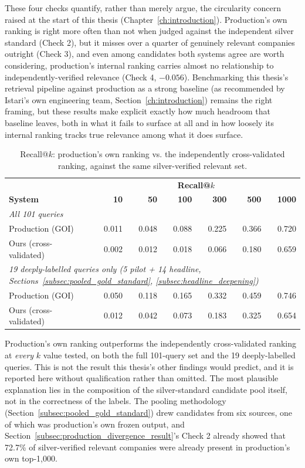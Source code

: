 \documentclass[a4paper,oneside,bibliography=totoc]{scrbook}
\begin{document}
These four checks quantify, rather than merely argue, the circularity concern raised at the start of this thesis (Chapter~\ref{ch:introduction}). Production's own ranking is right more often than not when judged against the independent silver standard (Check 2), but it misses over a quarter of genuinely relevant companies outright (Check 3), and even among candidates both systems agree are worth considering, production's internal ranking carries almost no relationship to independently-verified relevance (Check 4, $-0.056$). Benchmarking this thesis's retrieval pipeline against production as a strong baseline (as recommended by Istari's own engineering team, Section~\ref{ch:introduction}) remains the right framing, but these results make explicit exactly how much headroom that baseline leaves, both in what it fails to surface at all and in how loosely its internal ranking tracks true relevance among what it does surface.

\label{subsec:goi_vs_ours_ranking_result}

\begin{table}[ht]
\centering
\caption{Recall@$k$: production's own ranking vs. the independently cross-validated ranking, against the same silver-verified relevant set.}
\label{tab:goi_vs_ours}
\begin{tabular}{lrrrrrr}
\toprule
& \multicolumn{6}{c}{\textbf{Recall@$k$}} \\
\textbf{System} & \textbf{10} & \textbf{50} & \textbf{100} & \textbf{300} & \textbf{500} & \textbf{1000} \\
\midrule
\multicolumn{7}{l}{\emph{All 101 queries}} \\
Production (GOI)               & 0.011 & 0.048 & 0.088 & 0.225 & 0.366 & 0.720 \\
Ours (cross-validated)         & 0.002 & 0.012 & 0.018 & 0.066 & 0.180 & 0.659 \\
\midrule
\multicolumn{7}{l}{\emph{19 deeply-labelled queries only (5 pilot + 14 headline, Sections~\ref{subsec:pooled_gold_standard}, \ref{subsec:headline_deepening})}} \\
Production (GOI)               & 0.050 & 0.118 & 0.165 & 0.332 & 0.459 & 0.746 \\
Ours (cross-validated)         & 0.012 & 0.042 & 0.073 & 0.183 & 0.325 & 0.654 \\
\bottomrule
\end{tabular}
\end{table}

Production's own ranking outperforms the independently cross-validated ranking at \emph{every} $k$ value tested, on both the full 101-query set and the 19 deeply-labelled queries. This is not the result this thesis's other findings would predict, and it is reported here without qualification rather than omitted. The most plausible explanation lies in the composition of the silver-standard candidate pool itself, not in the correctness of the labels. The pooling methodology (Section~\ref{subsec:pooled_gold_standard}) drew candidates from six sources, one of which was production's own frozen output, and Section~\ref{subsec:production_divergence_result}'s Check 2 already showed that 72.7\% of silver-verified relevant companies were already present in production's own top-1{,}000.
\end{document}
